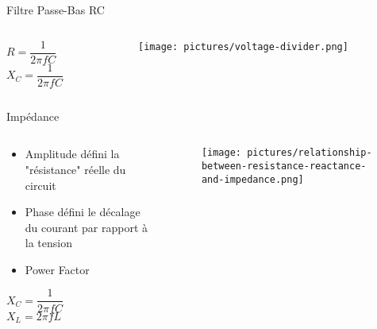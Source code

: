 \begin{frame}{Filtre Passe-Bas RC}
    \begin{columns}
        \begin{column}{0.33\textwidth}
            \begin{center}
                \Large{$R = \dfrac{1}{2 \pi f C}$}\\
                \vspace{10pt}
                \Large{$X_C = \dfrac{1}{2 \pi f C}$}
            \end{center}
        \end{column}
        
        \begin{column}{0.66\textwidth}
            \begin{figure}
                \centering
                \texttt{[image: pictures/voltage-divider.png]}
            \end{figure}
        \end{column}
    \end{columns}
\end{frame}


\begin{frame}{Impédance}
    \begin{columns}
        \begin{column}{0.4\textwidth}
            \begin{itemize}
                \item Amplitude défini la "résistance" réelle du circuit
                \item Phase défini le décalage du courant par rapport à la tension
                \item Power Factor
            \end{itemize}
            \par
            \vspace{10pt}
            \begin{center}
                \Large{$X_C = \dfrac{1}{2 \pi f C}$}\\
                \vspace{10pt}
                \Large{$X_L = 2 \pi f L$}
            \end{center}
        \end{column}
        
        \begin{column}{0.55\textwidth}
            \begin{figure}
                \centering
                \texttt{[image: pictures/relationship-between-resistance-reactance-and-impedance.png]}
            \end{figure}
        \end{column}
    \end{columns}
\end{frame}

